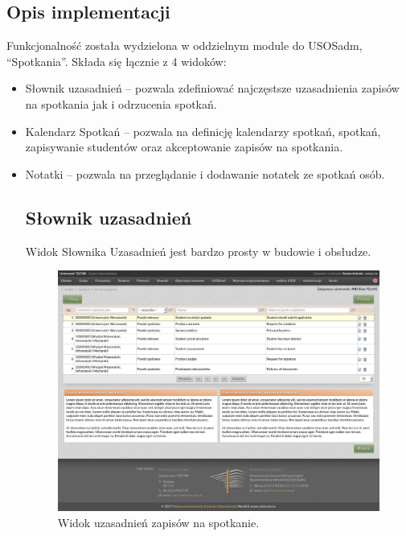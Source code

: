 \documentclass[licencjacka]{pracamgr}
\begin{document}
\subsection{Opis implementacji}
Funkcjonalność została wydzielona w oddzielnym module do USOSadm, \enquote{Spotkania}. Składa się łącznie z 4 widoków:
\begin{itemize}
\item Słownik uzasadnień -- pozwala zdefiniować najczęstsze uzasadnienia zapisów na spotkania jak i odrzucenia spotkań.
\item Kalendarz Spotkań -- pozwala na definicję kalendarzy spotkań, spotkań, zapisywanie studentów oraz akceptowanie zapisów na spotkania.
\item Notatki -- pozwala na przeglądanie i dodawanie notatek ze spotkań osób.

\subsection{Słownik uzasadnień}
Widok Słownika Uzasadnień jest bardzo prosty w budowie i obsłudze.

\begin{figure}[b!]
  \includegraphics[width=\linewidth]{widok_uzasadnien.jpg}
  \caption{Widok uzasadnień zapisów na spotkanie.}
  \label{fig:uzasadnienia}
\end{figure}


\end{itemize}
\end{document}
